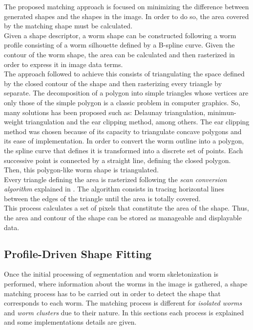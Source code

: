 The proposed matching approach is focused on minimizing the difference between generated
shapes and the shapes in the image. In order to do so, the area covered by the matching shape
must be calculated.\\ 
Given a shape descriptor, a worm shape can be
constructed following a worm profile consisting of a worm silhouette defined by 
a B-spline curve. Given the contour of the worm shape, the area can be calculated and 
then rasterized in order to express it in image data terms.\\

The approach followed to achieve this consists of triangulating the space defined by the
closed contour of the shape and then rasterizing every triangle by separate. The
decomposition of a polygon into simple triangles whose vertices are only those of
the simple polygon is a classic problem in computer graphics. So, many solutions
has been proposed such as: Delaunay triangulation, minimun-weight triangulation and
the ear clipping method, among others. The ear clipping method was chosen because
of its capacity to triangulate concave polygons and its ease of implementation.
In order to convert the worm outline into a polygon, the spline curve that defines it 
is transformed into a discrete set of points. Each successive point is connected
by a straight line, defining the closed polygon. Then, this polygon-like worm shape
is triangulated.\\

Every triangle defining the area is rasterized following the \emph{scan conversion algorithm}
explained in \cite{scanconversion}. The algorithm consists in tracing horizontal lines 
between the edges of the triangle until the area is totally covered.\\

This process calculates a set of pixels that constitute the area of the shape. Thus, 
the area and contour of the shape can be stored as manageable and displayable data.


\subsection{Profile-Driven Shape Fitting}
\label{sec:metfit}

Once the initial processing of segmentation and worm skeletonization is performed, where 
information about the worms in the image is gathered, a shape matching process has to be 
carried out in order to detect the shape that corresponds to each worm.
 The matching process is different for
\emph{isolated worms} and \emph{worm clusters}  
due to their nature. In this sections each process is explained and some 
implementations details are given.


